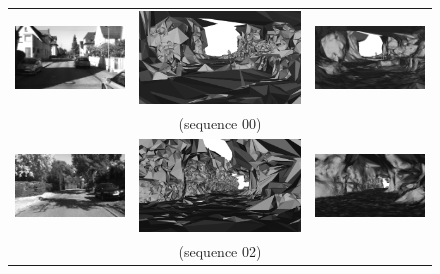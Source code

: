 \begin{figure}[tp]
\centering
\setlength{\tabcolsep}{1px}
\begin{tabular}{ccc}
\includegraphics[height=0.2\textwidth]{./img/ch-incr-dens/00borig00}&
\includegraphics[height=0.2\textwidth]{./img/ch-incr-dens/00binit00}&
\includegraphics[height=0.2\textwidth]{./img/ch-incr-dens/00bref00}\\
&(sequence 00)&\\
\includegraphics[height=0.2\textwidth]{./img/ch-incr-dens/02aorig00}&
\includegraphics[height=0.2\textwidth]{./img/ch-incr-dens/02ainit00}&
\includegraphics[height=0.2\textwidth]{./img/ch-incr-dens/02aref00}\\
&(sequence 02)&\\

\end{tabular}
\end{figure}
